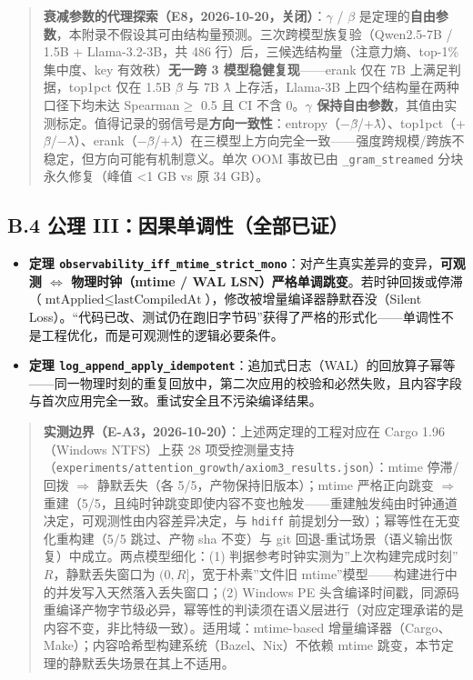 \begin{quote}
\textbf{衰减参数的代理探索（E8，2026-10-20，关闭）}：\(\gamma\) /
\(\beta\)
是定理的\textbf{自由参数}，本附录不假设其可由结构量预测。三次跨模型族复验（Qwen2.5-7B
/ 1.5B + Llama-3.2-3B，共 486 行）后，三候选结构量（注意力熵、top-1\%
集中度、key 有效秩）\textbf{无一跨 3 模型稳健复现}------erank 仅在 7B
上满足判据，top1pct 仅在 1.5B \(\beta\)̂ 与 7B \(\lambda\)̂
上存活，Llama-3B 上四个结构量在两种口径下均未达
\textbar Spearman\textbar{}\(\ge\) 0.5 且 CI 不含 0。\textbf{\(\gamma\)
保持自由参数}，其值由实测标定。值得记录的弱信号是\textbf{方向一致性}：entropy（−\(\beta\)̂/+\(\lambda\)̂）、top1pct（+\(\beta\)̂/−\(\lambda\)̂）、erank（−\(\beta\)̂/+\(\lambda\)̂）在三模型上方向完全一致------强度跨规模/跨族不稳定，但方向可能有机制意义。单次
OOM 事故已由 \texttt{\_gram\_streamed} 分块永久修复（峰值 \textless1 GB
vs 原 34 GB）。
\end{quote}

\subsection{B.4 公理
III：因果单调性（全部已证）}\label{b.4-ux516cux7406-iiiux56e0ux679cux5355ux8c03ux6027ux5168ux90e8ux5df2ux8bc1}

\begin{itemize}
\tightlist
\item
  \textbf{定理
  \texttt{observability\_iff\_mtime\_strict\_mono}}：对产生真实差异的变异，\textbf{可观测
  \(\Leftrightarrow\) 物理时钟（mtime / WAL
  LSN）严格单调跳变}。若时钟回拨或停滞（\(\text{mtApplied} \le \text{lastCompiledAt}\)），修改被增量编译器静默吞没（Silent
  Loss）。``代码已改、测试仍在跑旧字节码''获得了严格的形式化------单调性不是工程优化，而是可观测性的逻辑必要条件。
\item
  \textbf{定理
  \texttt{log\_append\_apply\_idempotent}}：追加式日志（WAL）的回放算子幂等------同一物理时刻的重复回放中，第二次应用的校验和必然失败，且内容字段与首次应用完全一致。重试安全且不污染编译结果。
\end{itemize}

\begin{quote}
\textbf{实测边界（E-A3，2026-10-20）}：上述两定理的工程对应在 Cargo
1.96（Windows NTFS）上获 28
项受控测量支持（\texttt{experiments/attention\_growth/axiom3\_results.json}）：mtime
停滞/回拨 \(\Rightarrow\) 静默丢失（各 5/5，产物保持旧版本）；mtime
严格正向跳变 \(\Rightarrow\)
重建（5/5，且纯时钟跳变即使内容不变也触发------重建触发纯由时钟通道决定，可观测性由内容差异决定，与
\texttt{hdiff} 前提划分一致）；幂等性在无变化重构建（5/5 跳过、产物 sha
不变）与 git 回退-重试场景（语义输出恢复）中成立。两点模型细化：(1)
判据参考时钟实测为''上次构建完成时刻'' \(R\)，静默丢失窗口为
\((0, R]\)，宽于朴素''文件旧
mtime''模型------构建进行中的并发写入天然落入丢失窗口；(2) Windows PE
头含编译时间戳，同源码重编译产物字节级必异，幂等性的判读须在语义层进行（对应定理承诺的是内容不变，非比特级一致）。适用域：mtime-based
增量编译器（Cargo、Make）；内容哈希型构建系统（Bazel、Nix）不依赖 mtime
跳变，本节定理的静默丢失场景在其上不适用。
\end{quote}

